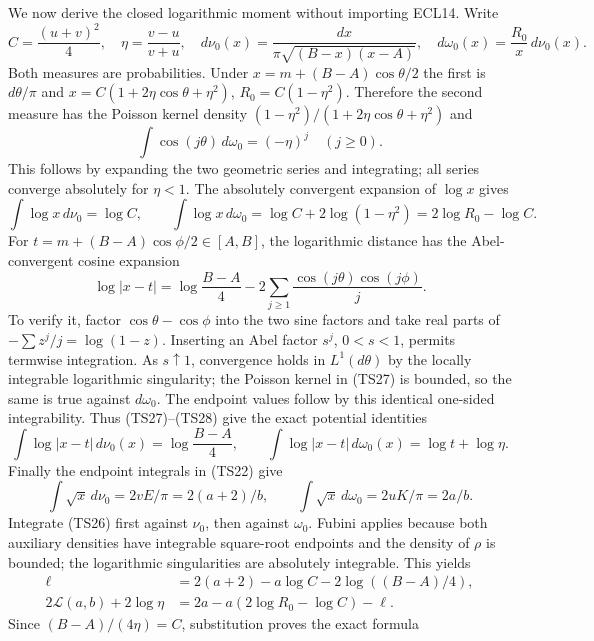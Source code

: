\documentclass[11pt]{article}
\newcommand{\dd}{\,d}
\begin{document}
We now derive the closed logarithmic moment without importing ECL14.
Write
\[
 C=\frac{(u+v)^2}{4},\quad\eta=\frac{v-u}{v+u},\quad
 d\nu_0(x)=\frac{dx}{\pi\sqrt{(B-x)(x-A)}},\quad
 d\omega_0(x)=\frac{R_0}{x}\dd\nu_0(x).
\]
Both measures are probabilities. Under $x=m+(B-A)\cos\theta/2$
the first is $d\theta/\pi$ and
$x=C(1+2\eta\cos\theta+\eta^2)$,
$R_0=C(1-\eta^2)$. Therefore the second measure has the Poisson
kernel density $(1-\eta^2)/(1+2\eta\cos\theta+\eta^2)$ and
\begin{equation}\tag{TS27}
 \int\cos(j\theta)\dd\omega_0=(-\eta)^j\quad(j\geq0).
\end{equation}
This follows by expanding the two geometric series and integrating;
all series converge absolutely for $\eta<1$.
The absolutely convergent expansion of $\log x$ gives
\begin{equation}\tag{TS28}
 \int\log x\dd\nu_0=\log C,\qquad
 \int\log x\dd\omega_0=\log C+2\log(1-\eta^2)
 =2\log R_0-\log C.
\end{equation}
For $t=m+(B-A)\cos\phi/2\in[A,B]$, the logarithmic distance has
the Abel-convergent cosine expansion
\[
 \log|x-t|=\log\frac{B-A}{4}
       -2\sum_{j\geq1}\frac{\cos(j\theta)\cos(j\phi)}j.
\]
To verify it, factor $\cos\theta-\cos\phi$ into the two sine
factors and take real parts of $-\sum z^j/j=\log(1-z)$.
Inserting an Abel factor $s^j$, $0<s<1$, permits termwise
integration. As $s\uparrow1$, convergence holds in $L^1(d\theta)$
by the locally integrable logarithmic singularity; the Poisson
kernel in (TS27) is bounded, so the same is true against $d\omega_0$.
The endpoint values follow by this identical one-sided integrability.
Thus (TS27)--(TS28) give the exact potential identities
\begin{equation}\tag{TS29}
 \int\log|x-t|\dd\nu_0(x)=\log\frac{B-A}{4},\qquad
 \int\log|x-t|\dd\omega_0(x)=\log t+\log\eta.
\end{equation}
Finally the endpoint integrals in (TS22) give
\[
 \int\sqrt x\dd\nu_0=2vE/\pi=2(a+2)/b,\qquad
 \int\sqrt x\dd\omega_0=2uK/\pi=2a/b.
\]
Integrate (TS26) first against $\nu_0$, then against $\omega_0$.
Fubini applies because both auxiliary densities have integrable
square-root endpoints and the density of $\rho$ is bounded;
the logarithmic singularities are absolutely integrable. This yields
\begin{align*}
 \ell&=2(a+2)-a\log C-2\log((B-A)/4),\\
 2\mathcal L(a,b)+2\log\eta
 &=2a-a(2\log R_0-\log C)-\ell.
\end{align*}
Since $(B-A)/(4\eta)=C$, substitution proves the exact formula
\end{document}
